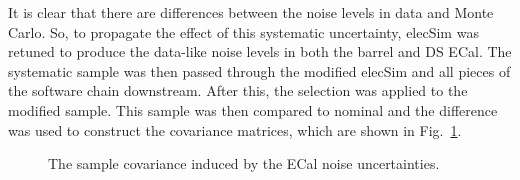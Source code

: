 It is clear that there are differences between the noise levels in data and Monte Carlo.  So, to propagate the effect of this systematic uncertainty, elecSim was retuned to produce the data-like noise levels in both the barrel and DS ECal.  The systematic sample was then passed through the modified elecSim and all pieces of the software chain downstream.  After this, the selection was applied to the modified sample.  This sample was then compared to nominal and the difference was used to construct the covariance matrices, which are shown in Fig.~\ref{fig:ECalNoiseCovarianceMatrices}.
\begin{figure}%
  \centering
  \caption{The sample covariance induced by the ECal noise uncertainties.}
  \label{fig:ECalNoiseCovarianceMatrices}
\end{figure}
\newline
\newline
